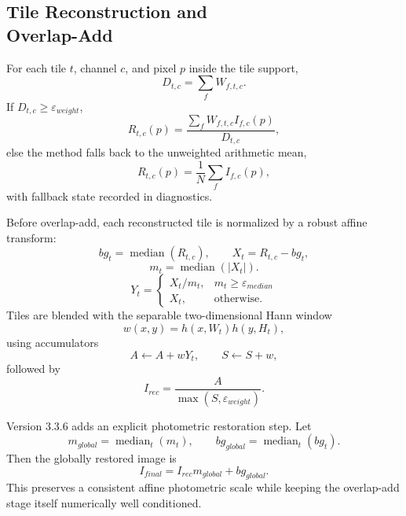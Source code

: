 \documentclass[10pt,twocolumn]{article}
\begin{document}
\subsection{Tile Reconstruction and \protect \\Overlap-Add}

For each tile $t$, channel $c$, and pixel $p$ inside the tile support,
\begin{equation}
  D_{t,c} = \sum_f W_{f,t,c}.
\end{equation}
If $D_{t,c}\ge \varepsilon_{weight}$,
\begin{equation}
  R_{t,c}(p) = \frac{\sum_f W_{f,t,c} I_{f,c}(p)}{D_{t,c}},
\end{equation}
else the method falls back to the unweighted arithmetic mean,
\begin{equation}
  R_{t,c}(p) = \frac{1}{N}\sum_f I_{f,c}(p),
\end{equation}
with fallback state recorded in diagnostics.

Before overlap-add, each reconstructed tile is normalized by a robust affine transform:
\begin{equation}
  bg_t = \operatorname{median}(R_{t,c}),
  \qquad
  X_t = R_{t,c} - bg_t,
\end{equation}
\begin{equation}
  m_t = \operatorname{median}(|X_t|).
\end{equation}
\begin{equation}
  Y_t =
  \begin{cases}
    X_t/m_t, & m_t \ge \varepsilon_{median} \\
    X_t, & \text{otherwise}.
  \end{cases}
\end{equation}
Tiles are blended with the separable two-dimensional Hann window
\begin{equation}
  w(x,y)=h(x,W_t)h(y,H_t),
\end{equation}
using accumulators
\begin{equation}
  A \leftarrow A + wY_t,
  \qquad
  S \leftarrow S + w,
\end{equation}
followed by
\begin{equation}
  I_{rec} = \frac{A}{\max(S,\varepsilon_{weight})}.
\end{equation}

Version 3.3.6 adds an explicit photometric restoration step. Let
\begin{equation}
  m_{global} = \operatorname{median}_t(m_t),
  \qquad
  bg_{global} = \operatorname{median}_t(bg_t).
\end{equation}
Then the globally restored image is
\begin{equation}
  I_{final} = I_{rec}m_{global} + bg_{global}.
\end{equation}
This preserves a consistent affine photometric scale while keeping the overlap-add stage itself numerically well conditioned.
\end{document}
